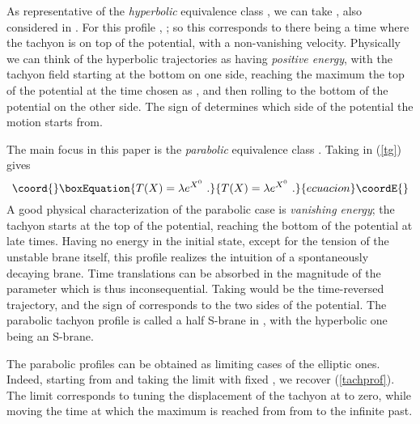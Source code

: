\documentclass[a4paper,12pt]{article}
\begin{document}
As representative of the {\it hyperbolic} equivalence class \coordHE{}, 
we can take \coordHE{}, also considered in \cite{Sen1}. For this 
profile \coordHE{}, \coordHE{}; so this corresponds to 
there being a time where the tachyon is on top of the potential, with a non-vanishing
velocity.  Physically we can think of the hyperbolic trajectories as having {\it positive
energy}, with the tachyon field starting at the bottom on one side, reaching
the maximum the top of the potential at the time chosen as \coordHE{}, and then
rolling to the bottom of the potential on the other side. The sign of \coordHE{}
determines which side of the potential the motion starts from.

The main focus in this paper is the {\it parabolic} equivalence class
\coordHE{}.  Taking \coordHE{} in
(\ref{tg}) gives
\begin{equation}\coord{}\boxEquation{
T(X)= \lambda e^{X^0}~.
\label{tg3}
\label{tachprof}
}{
T(X)= \lambda e^{X^0}~.
}{ecuacion}\coordE{}\end{equation}
A good physical characterization of the parabolic case is 
{\it vanishing energy}; the tachyon starts at the top of the potential, reaching 
the bottom of the potential at late times. Having no energy in the
initial state, except for the tension of the unstable brane itself, this profile 
realizes the intuition of a spontaneously decaying brane. 
Time translations can be absorbed in the magnitude of the parameter 
\myHighlight{$\lambda$}\coordHE{} which is thus inconsequential. Taking \coordHE{} 
would be the time-reversed trajectory, and the sign of \myHighlight{$\lambda$}\coordHE{} corresponds
to the two sides of the potential.
The parabolic tachyon profile is called a half S-brane in \cite{Strominger:2002pc}, 
with the hyperbolic one being an S-brane.

The parabolic profiles can be obtained as limiting cases of the elliptic ones.
Indeed, starting from \coordHE{} and taking the
limit  \coordHE{} with fixed 
\coordHE{}, we recover (\ref{tachprof}).
The limit corresponds to tuning the displacement of the tachyon at \coordHE{} to 
zero, while moving the time at which the maximum is reached from 
from \coordHE{} to the infinite past. 
\end{document}
